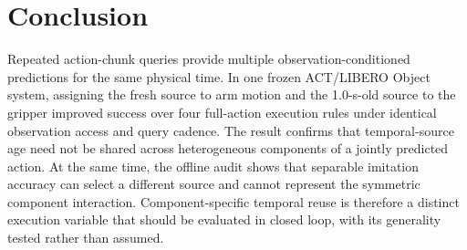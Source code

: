 \section{Conclusion}
\label{sec:conclusion}

Repeated action-chunk queries provide multiple observation-conditioned
predictions for the same physical time. In one frozen ACT/LIBERO Object system,
assigning the fresh source to arm motion and the 1.0-s-old source to the gripper
improved success over four full-action execution rules under identical
observation access and query cadence. The result confirms that temporal-source
age need not be shared across heterogeneous components of a jointly predicted
action. At the same time, the offline audit shows that separable imitation
accuracy can select a different source and cannot represent the symmetric
component interaction. Component-specific temporal reuse is therefore a
distinct execution variable that should be evaluated in closed loop, with its
generality tested rather than assumed.
